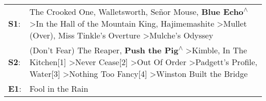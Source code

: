 \begin{supertabular}{p{0.03\textwidth}p{0.92\textwidth}}
 \textbf{S1}:  &                                                                             The Crooked One\textsuperscript{}, \enspace Walletsworth\textsuperscript{}, \enspace Señor Mouse\textsuperscript{}, \enspace \textbf{Blue Echo\textsuperscript{$\wedge$}} \textgreater \enspace In the Hall of the Mountain King\textsuperscript{}, \enspace Hajimemashite\textsuperscript{} \textgreater \enspace Mullet (Over)\textsuperscript{}, \enspace Miss Tinkle's Overture\textsuperscript{} \textgreater \enspace Mulche's Odyssey\textsuperscript{}  \enspace  \\
 \textbf{S2}:  &  (Don't Fear) The Reaper\textsuperscript{}, \enspace \textbf{Push the Pig\textsuperscript{$\wedge$}} \textgreater \enspace Kimble\textsuperscript{}, \enspace In The Kitchen[1]\textsuperscript{} \textgreater \enspace Never Cease[2]\textsuperscript{} \textgreater \enspace Out Of Order\textsuperscript{} \textgreater \enspace Padgett's Profile\textsuperscript{}, \enspace Water[3]\textsuperscript{} \textgreater \enspace Nothing Too Fancy[4]\textsuperscript{} \textgreater \enspace Winston Built the Bridge\textsuperscript{}  \enspace  \\
 \textbf{E1}:  &                                                                                                                                                                                                                                                                                                                                                                                                                                                                                                         Fool in the Rain\textsuperscript{}  \enspace  \\
\end{supertabular}
